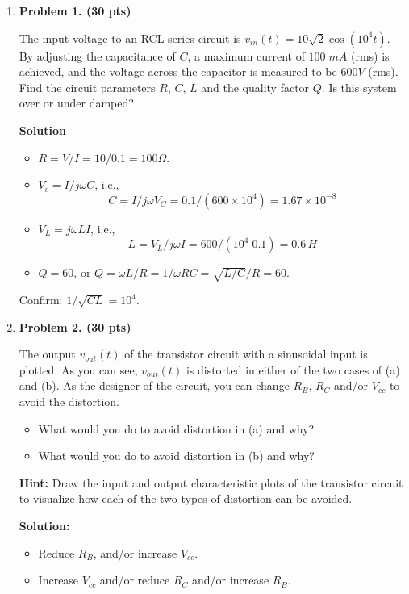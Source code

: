\begin{enumerate}

\item {\bf Problem 1. (30 pts)} 

The input voltage to an RCL series circuit is $v_{in}(t)=10\sqrt{2}\cos(10^4 t)$.
By adjusting the capacitance of $C$, a maximum current of $100\;mA$ (rms) is 
achieved, and the voltage across the capacitor is measured to be $600 V$ (rms).
Find the circuit parameters $R$, $C$, $L$ and the quality factor $Q$. Is this 
system over or under damped?

{\bf Solution}
\begin{itemize}
\item $R=V/I=10/0.1=100\Omega$.
\item $V_c=I/j\omega C$, i.e., 
  \[ C=I/j\omega V_C=0.1/(600\times 10^4)=1.67\times 10^{-8} \]
\item $V_L=j\omega L I$, i.e., 
  \[ L=V_L/j \omega I=600/(10^4\; 0.1)=0.6\,H \]
\item $Q=60$, or $Q=\omega L/R=1/\omega RC=\sqrt{L/C}/R=60$.
\end{itemize}
Confirm: $1/\sqrt{CL}=10^4$.

\item {\bf Problem 2. (30 pts)} 

The output $v_{out}(t)$ of the transistor circuit with a sinusoidal input
is plotted. As you can see, $v_{out}(t)$ is distorted in either of the two
cases of (a) and (b). As the designer of the circuit, you can change $R_B$,
$R_C$ and/or $V_{cc}$ to avoid the distortion. 


\begin{itemize}
\item What would you do to avoid distortion in (a) and why? 
\item What would you do to avoid distortion in (b) and why? 
\end{itemize}


{\bf Hint:} Draw the input and output characteristic plots of the transistor
circuit to visualize how each of the two types of distortion can be avoided.

{\bf Solution:}

\begin{itemize}
\item Reduce $R_B$, and/or increase $V_{cc}$.
\item Increase $V_{cc}$ and/or reduce $R_C$ and/or increase $R_B$.
\end{itemize}


\end{enumerate}
